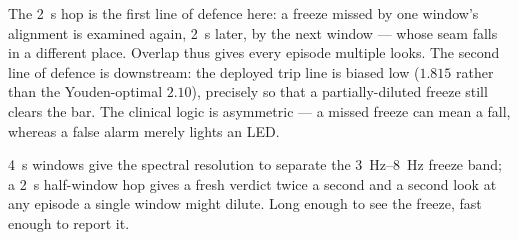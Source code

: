 The \SI{2}{s} hop is the first line of defence here: a freeze missed by one window's
alignment is examined again, \SI{2}{s} later, by the next window --- whose seam falls
in a different place. Overlap thus gives every episode multiple looks. The second
line of defence is downstream: the deployed trip line is biased low ($1.815$ rather
than the Youden-optimal $2.10$), precisely so that a partially-diluted freeze still
clears the bar. The clinical logic is asymmetric --- a missed freeze can mean a fall,
whereas a false alarm merely lights an LED.

\begin{takeaway}
\SI{4}{s} windows give the spectral resolution to separate the \SIrange{3}{8}{Hz}
freeze band; a \SI{2}{s} half-window hop gives a fresh verdict twice a second and a
second look at any episode a single window might dilute. Long enough to see the
freeze, fast enough to report it.
\end{takeaway}
